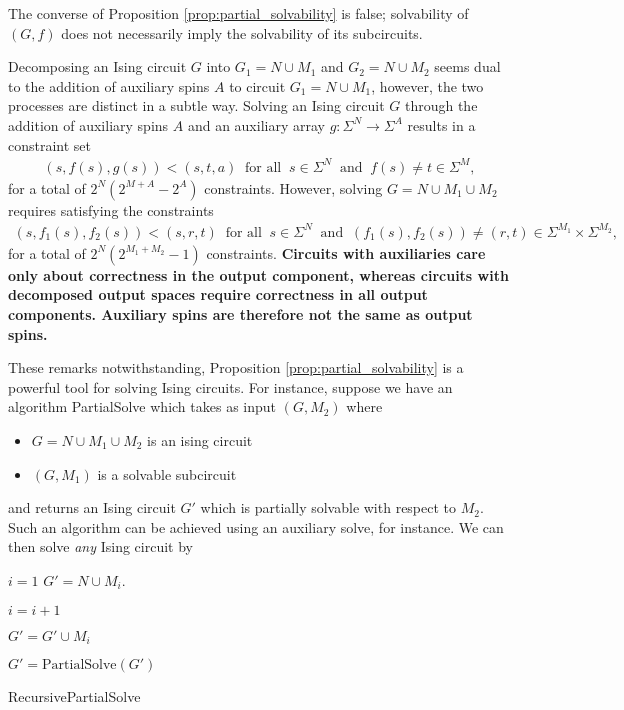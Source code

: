 \documentclass{amsart}
\begin{document}
\begin{rmk}
    The converse of Proposition \ref{prop:partial_solvability} is false; solvability of $(G,f)$ does not necessarily imply the solvability of its subcircuits.
\end{rmk}
\begin{rmk}
    Decomposing an Ising circuit $G$ into $G_1 = N \cup M_1$ and $G_2 = N \cup M_2$ seems dual to the addition of auxiliary spins $A$ to circuit $G_1 = N \cup M_1$, however, the two processes are distinct in a subtle way. Solving an Ising circuit $G$ through the addition of auxiliary spins $A$ and an auxiliary array $g:\Sigma^N \to \Sigma^A$ results in a constraint set
    \begin{align*}
        (s,f(s),g(s)) < (s,t,a) ~\text{ for all }~ s\in \Sigma^N ~\text{ and }~ f(s) \neq t\in \Sigma^M,
    \end{align*}
    for a total of $2^N(2^{M+A} - 2^A)$ constraints. However, solving $G = N \cup M_1 \cup M_2$ requires satisfying the constraints
    \begin{align*}
        (s,f_1(s),f_2(s)) < (s,r,t) ~\text{ for all }~ s\in \Sigma^N ~\text{ and }~ (f_1(s), f_2(s)) \neq (r,t) \in \Sigma^{M_1}\times \Sigma^{M_2},
    \end{align*}
    for a total of $2^N(2^{M_1 + M_2} - 1)$ constraints. \textbf{Circuits with auxiliaries care only about correctness in the output component, whereas circuits with decomposed output spaces require correctness in all output components. Auxiliary spins are therefore not the same as output spins.}
\end{rmk}

These remarks notwithstanding, Proposition \ref{prop:partial_solvability} is a powerful tool for solving Ising circuits. For instance, suppose we have an algorithm PartialSolve which takes as input $(G,M_2)$ where
\begin{itemize}
  \item $G = N\cup M_1 \cup M_2$ is an ising circuit
  \item $(G,M_1)$ is a solvable subcircuit
\end{itemize}
and returns an Ising circuit $G'$ which is partially solvable with respect to $M_2$. Such an algorithm can be achieved using an auxiliary solve, for instance. We can then solve \emph{any} Ising circuit by
\begin{algorithm}[!ht]
\DontPrintSemicolon
  
    $i = 1$
    $G' = N\cup M_i$.

  {
     $i = i + 1$

    $G' = G' \cup M_i$

    $G' = \text{PartialSolve}(G')$
  }
\caption{RecursivePartialSolve}
\end{algorithm}
\end{document}
